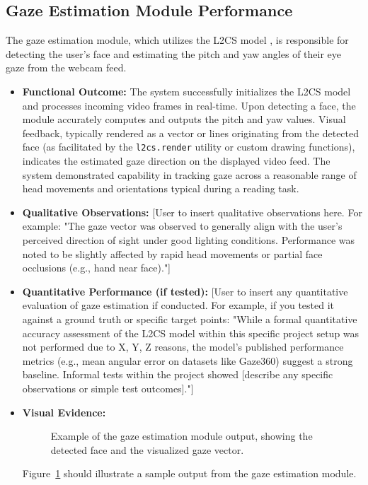 \subsection{Gaze Estimation Module Performance}
The gaze estimation module, which utilizes the L2CS model \cite{L2CSNet2022}, is responsible for detecting the user's face and estimating the pitch and yaw angles of their eye gaze from the webcam feed.
\begin{itemize}
    \item \textbf{Functional Outcome:} The system successfully initializes the L2CS model and processes incoming video frames in real-time. Upon detecting a face, the module accurately computes and outputs the pitch and yaw values. Visual feedback, typically rendered as a vector or lines originating from the detected face (as facilitated by the \texttt{l2cs.render} utility or custom drawing functions), indicates the estimated gaze direction on the displayed video feed. The system demonstrated capability in tracking gaze across a reasonable range of head movements and orientations typical during a reading task.
    
    \item \textbf{Qualitative Observations:} [User to insert qualitative observations here. For example: "The gaze vector was observed to generally align with the user's perceived direction of sight under good lighting conditions. Performance was noted to be slightly affected by rapid head movements or partial face occlusions (e.g., hand near face)."]
    
    \item \textbf{Quantitative Performance (if tested):} [User to insert any quantitative evaluation of gaze estimation if conducted. For example, if you tested it against a ground truth or specific target points: "While a formal quantitative accuracy assessment of the L2CS model within this specific project setup was not performed due to X, Y, Z reasons, the model's published performance metrics (e.g., mean angular error on datasets like Gaze360) suggest a strong baseline. Informal tests within the project showed [describe any specific observations or simple test outcomes]."]
    
    \item \textbf{Visual Evidence:}
    \begin{figure}[h!]
        \centering
        \framebox[0.7\textwidth][c]{\raisebox{0pt}[4cm][3cm]{Placeholder: Screenshot of Gaze Estimation}}
        \caption{Example of the gaze estimation module output, showing the detected face and the visualized gaze vector.}
        \label{fig:gaze_estimation_output}
    \end{figure}
    Figure~\ref{fig:gaze_estimation_output} should illustrate a sample output from the gaze estimation module. 
\end{itemize}

